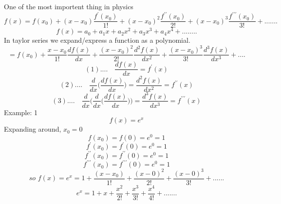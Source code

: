 One of the most importent thing in physics
\begin{equation}
f(x) = f(x_0)+(x-x_0)\frac{f^\prime(x_0)}{1!}+(x-x_0)^2\frac{f^{\prime\prime}(x_0)}{2!}+(x-x_0)^3\frac{f^{\prime\prime\prime}(x_0)}{3!}+.......
\end{equation}
\begin{equation}
f(x) = a_0+a_1x+a_2x^2+a_3x^3+a_4x^4+........
\end{equation}
In taylor series we expand/express a function as a polynomial.
\newline
\begin{equation}
= f(x_0)+\frac{x-x_0}{1!}\frac{df(x)}{dx}+\frac{(x-x_0)^2}{2!}\frac{d^2f(x)}{dx^2}+\frac{(x-x_0)^3}{3!}\frac{d^3f(x)}{dx^3}+....
\end{equation}
\begin{equation}
(1).... \quad \frac{df(x)}{dx} = f^\prime(x)
\end{equation}
\begin{equation}
(2).... \quad \frac{d}{dx}\bigg(\frac{df(x)}{dx}\bigg) = \frac{d^2f(x)}{dx^2} = f^{\prime\prime}(x)
\end{equation}
\begin{equation}
(3).... \quad \frac{d}{dx}\bigg(\frac{d}{dx}\bigg(\frac{df(x)}{dx}\bigg)\bigg) = \frac{d^3f(x)}{dx^3} = f^{\prime\prime\prime}(x)
\end{equation}
\newpage
Example: 1
\begin{displaymath}
f(x) = e^x
\end{displaymath}
Expanding around, $ x_0 = 0 $	
\begin{displaymath}
f(x_0) = f(0) = e^0=1
\end{displaymath}
\begin{displaymath}
f^\prime(x_0)=f^\prime(0)=e^0=1
\end{displaymath}
\begin{displaymath}
f^{\prime\prime}(x_0)=f^{\prime\prime}(0)=e^0=1
\end{displaymath}
\begin{displaymath}
f^{\prime\prime\prime}(x_0)=f^{\prime\prime\prime}(0)=e^0=1
\end{displaymath}
\begin{displaymath}
so \,\, f(x) = e^x=1+\frac{(x-x_0)}{1!}+\frac{(x-0)^2}{2!}+\frac{(x-0)^3}{3!}+......
\end{displaymath}
\begin{displaymath}
e^x = 1 + x+\frac{x^2}{2!}+\frac{x^3}{3!}+\frac{x^4}{4!}+.......
\end{displaymath}
